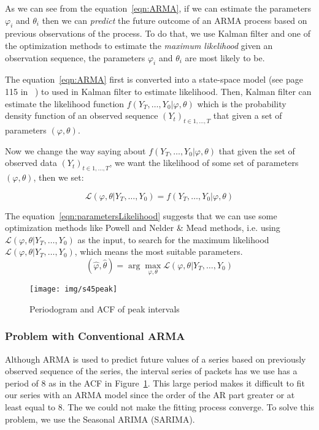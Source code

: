 \documentclass[12pt]{article}
\begin{document}
As we can see from the equation~\ref{eqn:ARMA}, if we can estimate the
parameters $\varphi_i$ and $\theta_i$ then we can \textit{predict} the future
outcome of an ARMA process based on previous observations of the process. To do
that, we use Kalman filter and one of the optimization methods to estimate the
\textit{maximum likelihood} given an observation sequence, the parameters
$\varphi_i$ and $\theta_i$ are most likely to be.

The equation~\ref{eqn:ARMA} first is converted into a state-space model (see
page 115 in~\cite{FalkStatSAS} ) to used in Kalman filter to estimate
likelihood. Then, Kalman filter can estimate the likelihood function
$f(Y_T,\ldots, Y_0|\varphi, \theta)$ which is the probability density
function of an observed sequence $(Y_t)_{t\in 1, \ldots, T}$ that given a set of
parameters $(\varphi, \theta)$.

Now we change the way saying about $f(Y_T,\ldots,Y_0|\varphi, \theta)$ that
given the set of observed data $(Y_t)_{t\in 1, \ldots, T}$, we want the likelihood of
some set of parameters $(\varphi, \theta)$, then we set:

\begin{equation}\label{eqn:parametersLikelihood}
\mathcal{L}(\varphi, \theta|Y_T,\ldots, Y_0) = f(Y_T,\ldots,Y_0|\varphi,
\theta)
\end{equation}

The equation~\ref{eqn:parametersLikelihood} suggests that we can use some
optimization methods like Powell and Nelder \& Mead methods, i.e. using
$\mathcal{L}(\varphi, \theta|Y_T,\ldots, Y_0)$ as the input, to search for the
maximum likelihood $\mathcal{L}(\varphi, \theta|Y_T,\ldots, Y_0)$, which means
the most suitable parameters.
\begin{equation}
(\hat{\varphi},\hat{\theta})=\arg\max_{\varphi, \theta} \mathcal{L}(\varphi,
\theta|Y_T,\ldots, Y_0)
\end{equation}

\begin{figure}[ht!]
\centering
\texttt{[image: img/s45peak]}
\caption{Periodogram and ACF of peak intervals}\label{fig:s45peak}
\end{figure}

\subsubsection{Problem with Conventional ARMA}
Although ARMA is used to predict future values of a series based on
previously observed sequence of the series, the interval series of packets has
we use has a period of 8 as in the ACF in Figure~\ref{fig:s45peak}. This large
period makes it difficult to fit our series with an ARMA model since the order of the AR
part greater or at least equal to 8. The we could not make the fitting process
converge. To solve this problem, we use the Seasonal ARIMA (SARIMA).
\end{document}
